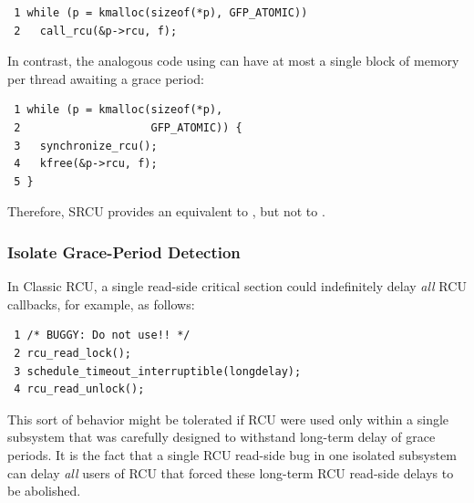 \vspace{5pt}
\begin{minipage}[t]{\columnwidth}
\scriptsize
\begin{verbatim}
 1 while (p = kmalloc(sizeof(*p), GFP_ATOMIC))
 2   call_rcu(&p->rcu, f);
\end{verbatim}
\end{minipage}
\vspace{5pt}

In contrast, the analogous code using  can
have at most a single block of memory per thread awaiting a grace period:

\vspace{5pt}
\begin{minipage}[t]{\columnwidth}
\scriptsize
\begin{verbatim}
 1 while (p = kmalloc(sizeof(*p),
 2                    GFP_ATOMIC)) {
 3   synchronize_rcu();
 4   kfree(&p->rcu, f);
 5 }
\end{verbatim}
\end{minipage}
\vspace{5pt}

Therefore, SRCU provides an equivalent to , but not
to .

\subsubsection{Isolate Grace-Period Detection}
\label{sec:app:rcuimpl:Isolate Grace-Period Detection}

In Classic RCU, a single read-side critical section could indefinitely
delay \emph{all} RCU callbacks, for example, as follows:

\vspace{5pt}
\begin{minipage}[t]{\columnwidth}
\scriptsize
\begin{verbatim}
 1 /* BUGGY: Do not use!! */
 2 rcu_read_lock();
 3 schedule_timeout_interruptible(longdelay);
 4 rcu_read_unlock();
\end{verbatim}
\end{minipage}
\vspace{5pt}

This sort of behavior might be tolerated if RCU were used only within
a single subsystem that was carefully designed to withstand long-term
delay of grace periods.
It is the fact that a single RCU read-side bug in one isolated subsystem can
delay \emph{all} users of RCU that forced these long-term RCU read-side
delays to be abolished.

